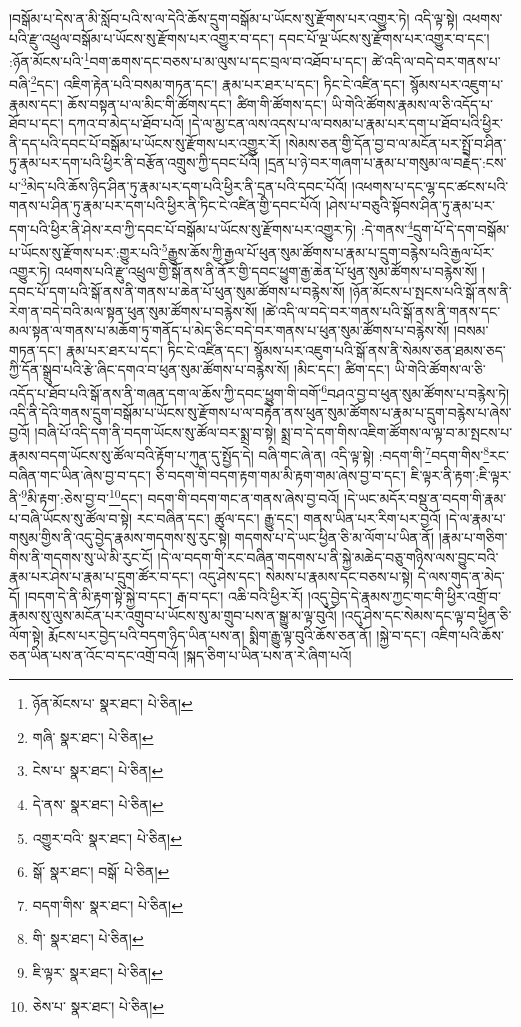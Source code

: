 །བསྒོམ་པ་དེས་ན་མི་སློབ་པའི་ས་ལ་དེའི་ཆོས་དྲུག་བསྒོམ་པ་ཡོངས་སུ་རྫོགས་པར་འགྱུར་ཏེ། འདི་ལྟ་སྟེ། འཕགས་པའི་རྫུ་འཕྲུལ་བསྒོམ་པ་ཡོངས་སུ་རྫོགས་པར་འགྱུར་བ་དང་། དབང་པོ་ལྔ་ཡོངས་སུ་རྫོགས་པར་འགྱུར་བ་དང་། :ཉོན་མོངས་པའི་\footnote{ཉོན་མོངས་པ་  སྣར་ཐང་།  པེ་ཅིན། }བག་ཆགས་དང་བཅས་པ་མ་ལུས་པ་དང་བྲལ་བ་འཐོབ་པ་དང་། ཚེ་འདི་ལ་བདེ་བར་གནས་པ་བཞི་\footnote{གཞི་  སྣར་ཐང་།  པེ་ཅིན། }དང་། འཇིག་རྟེན་པའི་བསམ་གཏན་དང་། རྣམ་པར་ཐར་པ་དང་། ཏིང་ངེ་འཛིན་དང་། སྙོམས་པར་འཇུག་པ་རྣམས་དང་། ཆོས་བསྟན་པ་ལ་མིང་གི་ཚོགས་དང་། ཚིག་གི་ཚོགས་དང་། ཡི་གེའི་ཚོགས་རྣམས་ལ་ཅི་འདོད་པ་ཐོབ་པ་དང་། དཀའ་བ་མེད་པ་ཐོབ་པའོ། །དེ་ལ་མྱ་ངན་ལས་འདས་པ་ལ་བསམ་པ་རྣམ་པར་དག་པ་ཐོབ་པའི་ཕྱིར་ནི་དད་པའི་དབང་པོ་བསྒོམ་པ་ཡོངས་སུ་རྫོགས་པར་འགྱུར་རོ། །སེམས་ཅན་གྱི་དོན་བྱ་བ་ལ་མངོན་པར་སྤྲོ་བ་ཤིན་ཏུ་རྣམ་པར་དག་པའི་ཕྱིར་ནི་བརྩོན་འགྲུས་ཀྱི་དབང་པོའོ། །དྲན་པ་ཉེ་བར་གཞག་པ་རྣམ་པ་གསུམ་ལ་བརྗེད་:ངས་པ་\footnote{ངེས་པ་  སྣར་ཐང་།  པེ་ཅིན། }མེད་པའི་ཆོས་ཉིད་ཤིན་ཏུ་རྣམ་པར་དག་པའི་ཕྱིར་ནི་དྲན་པའི་དབང་པོའོ། །འཕགས་པ་དང་ལྷ་དང་ཚངས་པའི་གནས་པ་ཤིན་ཏུ་རྣམ་པར་དག་པའི་ཕྱིར་ནི་ཏིང་ངེ་འཛིན་གྱི་དབང་པོའོ། །ཤེས་པ་བཅུའི་སྟོབས་ཤིན་ཏུ་རྣམ་པར་དག་པའི་ཕྱིར་ནི་ཤེས་རབ་ཀྱི་དབང་པོ་བསྒོམ་པ་ཡོངས་སུ་རྫོགས་པར་འགྱུར་ཏེ། :དེ་གནས་\footnote{དེ་ནས་  སྣར་ཐང་།  པེ་ཅིན། }དྲུག་པོ་དེ་དག་བསྒོམ་པ་ཡོངས་སུ་རྫོགས་པར་:གྱུར་པའི་\footnote{འགྱུར་བའི་  སྣར་ཐང་།  པེ་ཅིན། }རྒྱུས་ཆོས་ཀྱི་རྒྱལ་པོ་ཕུན་སུམ་ཚོགས་པ་རྣམ་པ་དྲུག་བརྙེས་པའི་རྒྱལ་པོར་འགྱུར་ཏེ། འཕགས་པའི་རྫུ་འཕྲུལ་གྱི་སྒོ་ནས་ནི་ནོར་གྱི་དབང་ཕྱུག་རྒྱ་ཆེན་པོ་ཕུན་སུམ་ཚོགས་པ་བརྙེས་སོ། །དབང་པོ་དག་པའི་སྒོ་ནས་ནི་གནས་པ་ཆེན་པོ་ཕུན་སུམ་ཚོགས་པ་བརྙེས་སོ། །ཉོན་མོངས་པ་སྤངས་པའི་སྒོ་ནས་ནི་རེག་ན་བདེ་བའི་མལ་སྟན་ཕུན་སུམ་ཚོགས་པ་བརྙེས་སོ། །ཚེ་འདི་ལ་བདེ་བར་གནས་པའི་སྒོ་ནས་ནི་གནས་དང་མལ་སྟན་ལ་གནས་པ་མཆོག་ཏུ་གནོད་པ་མེད་ཅིང་བདེ་བར་གནས་པ་ཕུན་སུམ་ཚོགས་པ་བརྙེས་སོ། །བསམ་གཏན་དང་། རྣམ་པར་ཐར་པ་དང་། ཏིང་ངེ་འཛིན་དང་། སྙོམས་པར་འཇུག་པའི་སྒོ་ནས་ནི་སེམས་ཅན་ཐམས་ཅད་ཀྱི་དོན་སྒྲུབ་པའི་རྩེ་ཞིང་དགའ་བ་ཕུན་སུམ་ཚོགས་པ་བརྙེས་སོ། །མིང་དང་། ཚིག་དང་། ཡི་གེའི་ཚོགས་ལ་ཅི་འདོད་པ་ཐོབ་པའི་སྒོ་ནས་ནི་གཞན་དག་ལ་ཆོས་ཀྱི་དབང་ཕྱུག་གི་བགོ་\footnote{སྒོ་  སྣར་ཐང་། བསྒོ་  པེ་ཅིན། }བཤའ་བྱ་བ་ཕུན་སུམ་ཚོགས་པ་བརྙེས་ཏེ། འདི་ནི་དེའི་གནས་དྲུག་བསྒོམ་པ་ཡོངས་སུ་རྫོགས་པ་ལ་བརྟེན་ནས་ཕུན་སུམ་ཚོགས་པ་རྣམ་པ་དྲུག་བརྙེས་པ་ཞེས་བྱའོ། །བཞི་པོ་འདི་དག་ནི་བདག་ཡོངས་སུ་ཚོལ་བར་སྨྲ་བ་སྟེ། སྨྲ་བ་དེ་དག་གིས་འཇིག་ཚོགས་ལ་ལྟ་བ་མ་སྤངས་པ་རྣམས་བདག་ཡོངས་སུ་ཚོལ་བའི་རྟོག་པ་ཀུན་དུ་སྤྱོད་དེ། བཞི་གང་ཞེ་ན། འདི་ལྟ་སྟེ། :བདག་གི་\footnote{བདག་གིས་  སྣར་ཐང་།  པེ་ཅིན། }བདག་གིས་\footnote{གི་  སྣར་ཐང་།  པེ་ཅིན། }རང་བཞིན་གང་ཡིན་ཞེས་བྱ་བ་དང་། ཅི་བདག་གི་བདག་རྟག་གམ་མི་རྟག་གམ་ཞེས་བྱ་བ་དང་། ཇི་ལྟར་ནི་རྟག་:ཇི་ལྟར་ནི་\footnote{ཇི་ལྟར་  སྣར་ཐང་།  པེ་ཅིན། }མི་རྟག་:ཅེས་བྱ་བ་\footnote{ཅེས་པ་  སྣར་ཐང་།  པེ་ཅིན། }དང་། བདག་གི་བདག་གང་ན་གནས་ཞེས་བྱ་བའོ། །དེ་ཡང་མདོར་བསྡུ་ན་བདག་གི་རྣམ་པ་བཞི་ཡོངས་སུ་ཚོལ་བ་སྟེ། རང་བཞིན་དང་། ཚུལ་དང་། རྒྱུ་དང་། གནས་ཡིན་པར་རིག་པར་བྱའོ། །དེ་ལ་རྣམ་པ་གསུམ་གྱིས་ནི་འདུ་བྱེད་རྣམས་གདགས་སུ་རུང་སྟེ། གདགས་པ་དེ་ཡང་ཕྱིན་ཅི་མ་ལོག་པ་ཡིན་ནོ། །རྣམ་པ་གཅིག་གིས་ནི་གདགས་སུ་ཡེ་མི་རུང་ངོ། །དེ་ལ་བདག་གི་རང་བཞིན་གདགས་པ་ནི་སྐྱེ་མཆེད་བཅུ་གཉིས་ལས་བྱུང་བའི་རྣམ་པར་ཤེས་པ་རྣམ་པ་དྲུག་ཚོར་བ་དང་། འདུ་ཤེས་དང་། སེམས་པ་རྣམས་དང་བཅས་པ་སྟེ། དེ་ལས་གུད་ན་མེད་དོ། །བདག་དེ་ནི་མི་རྟག་སྟེ་སྐྱེ་བ་དང་། རྒ་བ་དང་། འཆི་བའི་ཕྱིར་རོ། །འདུ་བྱེད་དེ་རྣམས་ཀྱང་གང་གི་ཕྱིར་འགྲོ་བ་རྣམས་སུ་ལུས་མངོན་པར་འགྲུབ་པ་ཡོངས་སུ་མ་གྲུབ་པས་ན་སྒྱུ་མ་ལྟ་བུའོ། །འདུ་ཤེས་དང་སེམས་དང་ལྟ་བ་ཕྱིན་ཅི་ལོག་སྟེ། རྨོངས་པར་བྱེད་པའི་བདག་ཉིད་ཡིན་པས་ན། སྨིག་རྒྱུ་ལྟ་བུའི་ཆོས་ཅན་ནོ། །སྐྱེ་བ་དང་། འཇིག་པའི་ཆོས་ཅན་ཡིན་པས་ན་འོང་བ་དང་འགྲོ་བའོ། །སྐད་ཅིག་པ་ཡིན་པས་ན་རེ་ཞིག་པའོ། 